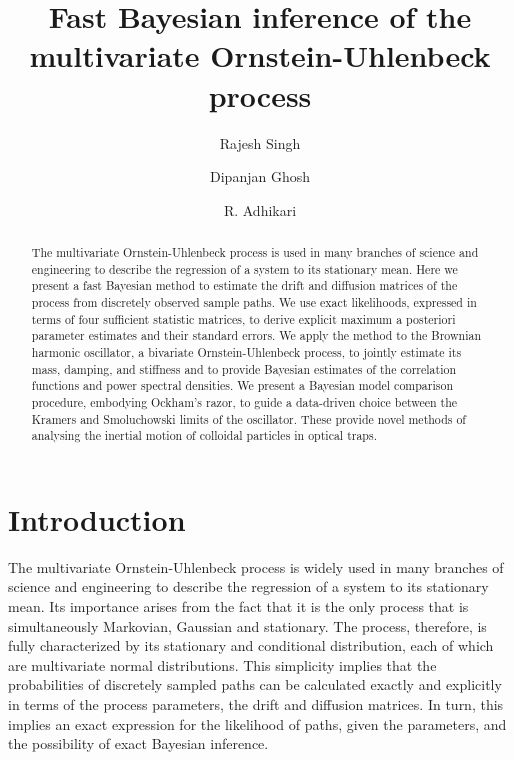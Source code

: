 \documentclass[english,aps, twocolumn, pre,superscriptaddress, notitlepage]{revtex4-1}
\begin{document}
\title{Fast Bayesian inference of the multivariate Ornstein-Uhlenbeck process}

\author{Rajesh Singh}


\author{Dipanjan Ghosh}


\author{R. Adhikari}



\begin{abstract}
The multivariate Ornstein-Uhlenbeck process is used in many branches
of science and engineering to describe the regression of a system
to its stationary mean. Here we present a fast Bayesian method to
estimate the drift and diffusion matrices of the process from discretely
observed sample paths. We use exact likelihoods, expressed in terms
of four sufficient statistic matrices, to derive explicit maximum
a posteriori parameter estimates and their standard errors. We apply
the method to the Brownian harmonic oscillator, a bivariate Ornstein-Uhlenbeck
process, to jointly estimate its mass, damping, and stiffness and
to provide Bayesian estimates of the correlation functions and power
spectral densities. We present a Bayesian model comparison procedure,
embodying Ockham's razor, to guide a data-driven choice between the
Kramers and Smoluchowski limits of the oscillator. These provide novel
methods of analysing the inertial motion of colloidal particles in
optical traps. 
\end{abstract}
\maketitle

\section{Introduction}

The multivariate Ornstein-Uhlenbeck process is widely used in many
branches of science and engineering to describe the regression of
a system to its stationary mean. Its importance arises from the fact
that it is the only process that is simultaneously Markovian, Gaussian
and stationary. The process, therefore, is fully characterized by
its stationary and conditional distribution, each of which are multivariate
normal distributions. This simplicity implies that the probabilities
of discretely sampled paths can be calculated exactly and explicitly
in terms of the process parameters, the drift and diffusion matrices.
In turn, this implies an exact expression for the likelihood of paths,
given the parameters, and the possibility of exact Bayesian inference. 
\end{document}
